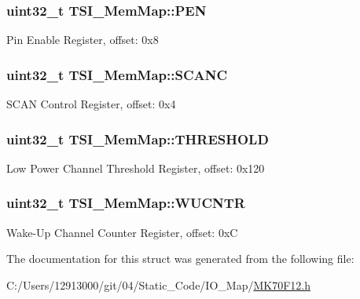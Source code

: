 \subsubsection[{P\+E\+N}]{\setlength{\rightskip}{0pt plus 5cm}uint32\+\_\+t T\+S\+I\+\_\+\+Mem\+Map\+::\+P\+E\+N}\label{struct_t_s_i___mem_map_a37c8a06461ca09948d6a65a1289bccd9}
Pin Enable Register, offset\+: 0x8 \hypertarget{struct_t_s_i___mem_map_abbf29c929817b57dbec256343e066a85}{}
\subsubsection[{S\+C\+A\+N\+C}]{\setlength{\rightskip}{0pt plus 5cm}uint32\+\_\+t T\+S\+I\+\_\+\+Mem\+Map\+::\+S\+C\+A\+N\+C}\label{struct_t_s_i___mem_map_abbf29c929817b57dbec256343e066a85}
S\+C\+A\+N Control Register, offset\+: 0x4 \hypertarget{struct_t_s_i___mem_map_a716863c50b790ef08399633c624ad313}{}
\subsubsection[{T\+H\+R\+E\+S\+H\+O\+L\+D}]{\setlength{\rightskip}{0pt plus 5cm}uint32\+\_\+t T\+S\+I\+\_\+\+Mem\+Map\+::\+T\+H\+R\+E\+S\+H\+O\+L\+D}\label{struct_t_s_i___mem_map_a716863c50b790ef08399633c624ad313}
Low Power Channel Threshold Register, offset\+: 0x120 \hypertarget{struct_t_s_i___mem_map_ae36ce42bd55889c91be08af94a07203e}{}
\subsubsection[{W\+U\+C\+N\+T\+R}]{\setlength{\rightskip}{0pt plus 5cm}uint32\+\_\+t T\+S\+I\+\_\+\+Mem\+Map\+::\+W\+U\+C\+N\+T\+R}\label{struct_t_s_i___mem_map_ae36ce42bd55889c91be08af94a07203e}
Wake-\/\+Up Channel Counter Register, offset\+: 0x\+C 

The documentation for this struct was generated from the following file\+:\begin{DoxyCompactItemize}
\item 
C\+:/\+Users/12913000/git/04/\+Static\+\_\+\+Code/\+I\+O\+\_\+\+Map/\hyperlink{_m_k70_f12_8h}{M\+K70\+F12.\+h}\end{DoxyCompactItemize}
